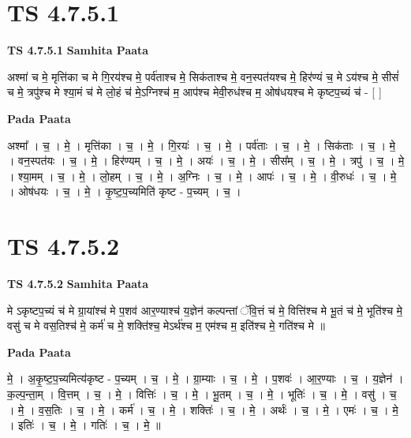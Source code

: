 \documentclass[17pt]{extarticle}
\begin{document}
\section*{ TS 4.7.5.1 }

\textbf{TS 4.7.5.1 } \newline
\textbf{Samhita Paata} \newline

अश्मा॑ च मे॒ मृत्ति॑का च मे गि॒रय॑श्च मे॒ पर्व॑ताश्च मे॒ सिक॑ताश्च मे॒     वन॒स्पत॑यश्च मे॒ हिर॑ण्यं च॒ मे ऽय॑श्च मे॒ सीसं॑ च मे॒ त्रपु॑श्च मे    श्या॒मं च॑ मे लो॒हं च॑ मे॒ऽग्निश्च॑ म॒ आप॑श्च मेवी॒रुध॑श्च म॒ ओष॑धयश्च मे कृष्टप॒च्यं च॑ - [  ] \newline

\textbf{Pada Paata} \newline

अश्मा᳚ । च॒ । मे॒ । मृत्ति॑का । च॒ । मे॒ । गि॒रयः॑ । च॒ । मे॒ । पर्व॑ताः । च॒ । मे॒ । सिक॑ताः । च॒ । मे॒ । वन॒स्पत॑यः । च॒ । मे॒ । हिर॑ण्यम् । च॒ । मे॒ । अयः॑ । च॒ । मे॒ । सीस᳚म् । च॒ । मे॒ । त्रपु॑ । च॒ । मे॒ । श्या॒मम् । च॒ । मे॒ । लो॒हम् । च॒ । मे॒ । अ॒ग्निः । च॒ । मे॒ । आपः॑ । च॒ । मे॒ । वी॒रुधः॑ । च॒ । मे॒ । ओष॑धयः । च॒ । मे॒ । कृ॒ष्ट॒प॒च्यमिति॑ कृष्ट - प॒च्यम् । च॒ ।  \newline




\section*{ TS 4.7.5.2 }

\textbf{TS 4.7.5.2 } \newline
\textbf{Samhita Paata} \newline

मे ऽकृष्टप॒च्यं च॑ मे ग्रा॒यांश्च॑ मे प॒शव॑ आर॒ण्याश्च॑ य॒ज्ञेन॑ कल्पन्तां ॅवि॒त्तं च॑ मे॒ वित्ति॑श्च मे भू॒तं च॑ मे॒ भूति॑श्च मे॒ वसु॑ च मे वस॒तिश्च॑ मे॒ कर्म॑ च मे॒ शक्ति॑श्च॒ मेऽर्थ॑श्च म॒ एम॑श्च म॒ इति॑श्च मे॒ गति॑श्च मे ॥ \newline

\textbf{Pada Paata} \newline

मे॒ । अ॒कृ॒ष्ट॒प॒च्यमित्य॑कृष्ट - प॒च्यम् । च॒ । मे॒ । ग्रा॒म्याः । च॒ । मे॒ । प॒शवः॑ । आ॒र॒ण्याः । च॒ । य॒ज्ञेन॑ । क॒ल्प॒न्ता॒म् । वि॒त्तम् । च॒ । मे॒ । वित्तिः॑ । च॒ । मे॒ । भू॒तम् । च॒ । मे॒ । भूतिः॑ । च॒ । मे॒ । वसु॑ । च॒ । मे॒ । व॒स॒तिः । च॒ । मे॒ । कर्म॑ । च॒ । मे॒ । शक्तिः॑ । च॒ । मे॒ । अर्थः॑ । च॒ । मे॒ । एमः॑ । च॒ । मे॒ । इतिः॑ । च॒ । मे॒ । गतिः॑ । च॒ । मे॒ ॥  \newline
\end{document}
